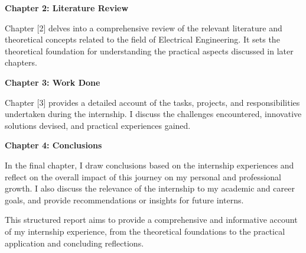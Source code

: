 \textbf{Chapter 2: Literature Review}

Chapter [2] delves into a comprehensive review of the relevant literature and theoretical concepts related to the field of Electrical Engineering. It sets the theoretical foundation for understanding the practical aspects discussed in later chapters.

\textbf{Chapter 3: Work Done}

Chapter [3] provides a detailed account of the tasks, projects, and responsibilities undertaken during the internship. I discuss the challenges encountered, innovative solutions devised, and practical experiences gained.

\textbf{Chapter 4: Conclusions}

In the final chapter, I draw conclusions based on the internship experiences and reflect on the overall impact of this journey on my personal and professional growth. I also discuss the relevance of the internship to my academic and career goals, and provide recommendations or insights for future interns.

This structured report aims to provide a comprehensive and informative account of my internship experience, from the theoretical foundations to the practical application and concluding reflections.
